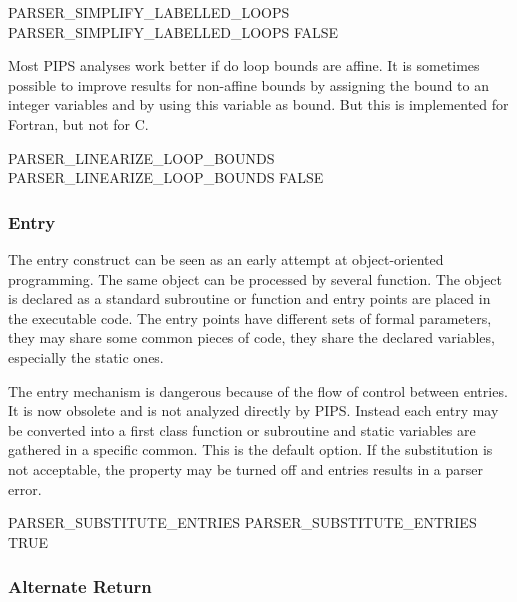 \documentclass[a4paper]{report}
\begin{document}
\begin{PipsProp}{PARSER_SIMPLIFY_LABELLED_LOOPS}
PARSER_SIMPLIFY_LABELLED_LOOPS FALSE
\end{PipsProp}

Most PIPS analyses work better if do loop bounds are affine. It is sometimes
possible to improve results for non-affine bounds by assigning the bound
to an integer variables and by using this variable as bound. But this
is implemented for Fortran, but not for C.

\begin{PipsProp}{PARSER_LINEARIZE_LOOP_BOUNDS}
PARSER_LINEARIZE_LOOP_BOUNDS FALSE
\end{PipsProp}

\subsubsection*{Entry}

The entry construct can be seen as an early attempt at object-oriented
programming. The same object can be processed by several function. The
object is declared as a standard subroutine or function and entry points
are placed in the executable code. The entry points have different sets of
formal parameters, they may share some common pieces of code, they share
the declared variables, especially the static ones.

The entry mechanism is dangerous because of the flow of control between
entries. It is now obsolete and is not analyzed directly by PIPS. Instead
each entry may be converted into a first class function or subroutine and
static variables are gathered in a specific common. This is the default
option. If the substitution is not acceptable, the property may be turned
off and entries results in a parser error.

\begin{PipsProp}{PARSER_SUBSTITUTE_ENTRIES}
PARSER_SUBSTITUTE_ENTRIES TRUE
\end{PipsProp}

\subsubsection*{Alternate Return}
\end{document}

